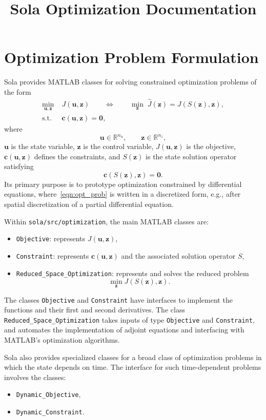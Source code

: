 \documentclass[11pt]{article}
\title{Sola Optimization Documentation}
\author{}
\date{}
\newcommand{\R}{\mathbb{R}}
\renewcommand{\u}{\bm{u}}
\newcommand{\z}{\bm{z}}
\newcommand{\cvec}{\bm{c}}
\newcommand{\0}{\bm{0}}
\newcommand{\Jhat}{\hat{J}}
\begin{document}
\maketitle

\section*{Optimization Problem Formulation}

Sola provides MATLAB classes for solving constrained optimization problems of the form
\begin{equation}
\begin{aligned} \label{eqn:opt_prob}
    \min_{\u,\z}\; & J(\u,\z)
    \qquad\Longleftrightarrow\qquad
    \min_{\z}\; \Jhat(\z) = J(S(\z),\z), \\
    \text{s.t.}\; & \cvec(\u,\z)=\0,
\end{aligned}
\end{equation}
where
\[
\u \in \R^{n_u}, \qquad \z \in \R^{n_z},
\]
\( \u \) is the state variable, \( \z \) is the control variable, \( J(\u,\z) \) is the objective, \( \cvec(\u,\z) \) defines the constraints, and \( S(\z) \) is the state solution operator satisfying
\[
\cvec(S(\z),\z)=\0.
\]
Its primary purpose is to prototype optimization constrained by differential equations, where~\eqref{eqn:opt_prob} is written in a discretized form, e.g., after spatial discretization of a partial differential equation. 

Within \texttt{sola/src/optimization}, the main MATLAB classes are:
\begin{itemize}
    \item \texttt{Objective}: represents \( J(\u,\z) \),
    \item \texttt{Constraint}: represents \( \cvec(\u,\z) \) and the associated solution operator \( S \),
    \item \texttt{Reduced\_Space\_Optimization}: represents and solves the reduced problem
    \[
    \min_{\z} J(S(\z),\z).
    \]
\end{itemize}
The classes \texttt{Objective} and \texttt{Constraint} have interfaces to implement the functions and their first and second derivatives.
The class \texttt{Reduced\_Space\_Optimization} takes inputs of type \texttt{Objective} and \texttt{Constraint}, and automates the implementation of adjoint equations and interfacing with MATLAB's optimization algorithms. 

Sola also provides specialized classes for a broad class of optimization problems in which the state depends on time. The interface for such time-dependent problems involves the classes:
\begin{itemize}
    \item \texttt{Dynamic\_Objective},
    \item \texttt{Dynamic\_Constraint}.
\end{itemize}
\end{document}
